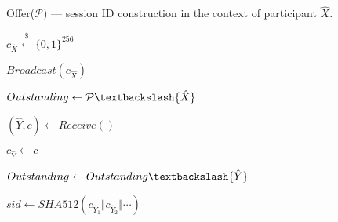   \caption{Offer($\mathcal{P}$) --- session ID construction in the context of participant $\hat{X}$.}
  \label{algo:offer}
  
  \Begin
  {
    $c_{\hat{X}} \xleftarrow{\$} \{0,1\}^{256}$

    $Broadcast(c_{\hat{X}})$

    $Outstanding \leftarrow \mathcal{P} \textbackslash \{\hat{X}\}$

    {
      $(\hat{Y}, c) \leftarrow Receive()$

      {
        $c_{\hat{Y}} \leftarrow c$

        $Outstanding \leftarrow Outstanding \textbackslash \{\hat{Y}\}$
      }
    }

    $sid \leftarrow SHA512(c_{\hat{Y}_1} \Vert c_{\hat{Y}_2} \Vert \cdots)$

  }
